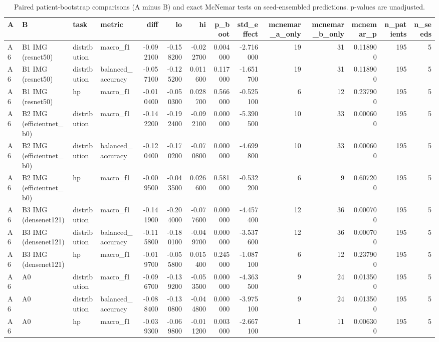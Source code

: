 \begin{table}
\caption{Paired patient-bootstrap comparisons (A minus B) and exact McNemar tests on seed-ensembled predictions. p-values are unadjusted.}
\label{tab:table7b_comparisons}
\begin{tabular}{llllrrrrrrrrrr}
\toprule
A & B & task & metric & diff & lo & hi & p\_boot & std\_effect & mcnemar\_a\_only & mcnemar\_b\_only & mcnemar\_p & n\_patients & n\_seeds \\
\midrule
A6 & B1 IMG (resnet50) & distribution & macro\_f1 & -0.092100 & -0.158200 & -0.022700 & 0.004000 & -2.716000 & 19 & 31 & 0.118900 & 195 & 5 \\
A6 & B1 IMG (resnet50) & distribution & balanced\_accuracy & -0.057100 & -0.125200 & 0.011600 & 0.117000 & -1.651700 & 19 & 31 & 0.118900 & 195 & 5 \\
A6 & B1 IMG (resnet50) & hp & macro\_f1 & -0.010400 & -0.050300 & 0.028700 & 0.566000 & -0.525100 & 6 & 12 & 0.237900 & 195 & 5 \\
A6 & B2 IMG (efficientnet\_b0) & distribution & macro\_f1 & -0.142200 & -0.192400 & -0.092100 & 0.000000 & -5.390500 & 10 & 33 & 0.000600 & 195 & 5 \\
A6 & B2 IMG (efficientnet\_b0) & distribution & balanced\_accuracy & -0.120400 & -0.170200 & -0.070800 & 0.000000 & -4.699800 & 10 & 33 & 0.000600 & 195 & 5 \\
A6 & B2 IMG (efficientnet\_b0) & hp & macro\_f1 & -0.009500 & -0.043500 & 0.026600 & 0.581000 & -0.532200 & 6 & 9 & 0.607200 & 195 & 5 \\
A6 & B3 IMG (densenet121) & distribution & macro\_f1 & -0.141900 & -0.204000 & -0.077600 & 0.000000 & -4.457400 & 12 & 36 & 0.000700 & 195 & 5 \\
A6 & B3 IMG (densenet121) & distribution & balanced\_accuracy & -0.115800 & -0.180100 & -0.049700 & 0.000000 & -3.537600 & 12 & 36 & 0.000700 & 195 & 5 \\
A6 & B3 IMG (densenet121) & hp & macro\_f1 & -0.019700 & -0.055800 & 0.015400 & 0.245000 & -1.087100 & 6 & 12 & 0.237900 & 195 & 5 \\
A6 & A0 & distribution & macro\_f1 & -0.096700 & -0.139200 & -0.053500 & 0.000000 & -4.363500 & 9 & 24 & 0.013500 & 195 & 5 \\
A6 & A0 & distribution & balanced\_accuracy & -0.088400 & -0.130800 & -0.044800 & 0.000000 & -3.975100 & 9 & 24 & 0.013500 & 195 & 5 \\
A6 & A0 & hp & macro\_f1 & -0.039300 & -0.069800 & -0.011200 & 0.003000 & -2.667100 & 1 & 11 & 0.006300 & 195 & 5 \\

\end{tabular}
\end{table}
